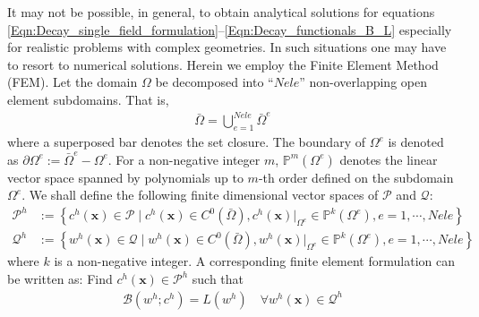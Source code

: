 \documentclass[11pt]{amsart}
\begin{document}
It may not be possible, in general, to obtain analytical solutions for equations 
\eqref{Eqn:Decay_single_field_formulation}--\eqref{Eqn:Decay_functionals_B_L} 
especially for realistic problems with complex geometries. In such situations 
one may have to resort to numerical solutions. Herein we employ the Finite 
Element Method (FEM). Let the domain $\Omega$ be decomposed into ``$Nele$'' 
non-overlapping open element subdomains. That is, 
\begin{align}
  \bar{\Omega} = \bigcup_{e = 1}^{Nele} \bar{\Omega}^{e}
\end{align}
where a superposed bar denotes the set closure. The boundary of $\Omega^e$ is denoted as 
$\partial \Omega^{e} := \bar{\Omega}^{e} - \Omega^{e}$. For a non-negative integer $m$, 
$\mathbb{P}^{m}(\Omega^{e})$ denotes the linear vector space spanned by polynomials up to 
$m$-th order defined on the subdomain $\Omega^{e}$. We shall define the following finite 
dimensional vector spaces of $\mathcal{P}$ and $\mathcal{Q}$:
\begin{subequations}
  \begin{align}
    \mathcal{P}^{h} &:= \left\{c^{h}(\mathbf{x}) \in \mathcal{P} \; \big| \; c^{h}(\mathbf{x}) 
      \in C^{0}(\bar{\Omega}), c^{h}(\mathbf{x}) \big|_{\Omega^e} \in \mathbb{P}^{k}(\Omega^{e}), 
      e = 1, \cdots, Nele \right\} \\
\mathcal{Q}^{h} &:= \left\{w^{h}(\mathbf{x}) \in \mathcal{Q} \; \big| \; w^{h}(\mathbf{x}) 
      \in C^{0}(\bar{\Omega}), w^{h}(\mathbf{x}) \big|_{\Omega^e} \in \mathbb{P}^{k}(\Omega^{e}), 
      e = 1, \cdots, Nele \right\}       
  \end{align}
\end{subequations}
where $k$ is a non-negative integer. A corresponding finite element formulation can be written as: 
Find $c^{h}(\mathbf{x}) \in \mathcal{P}^{h}$ such that
\begin{align}
\label{Eqn:Decay_single_field_FE_formulation}
\mathcal{B}(w^{h};c^{h}) = L(w^{h}) \quad \forall w^{h}(\mathbf{x}) \in \mathcal{Q}^{h}
\end{align}
\end{document}
